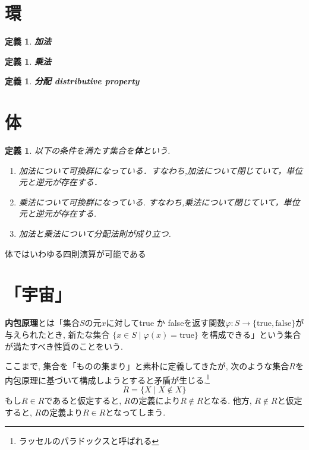 \documentclass[dvipdfmx]{jsbook}
\theoremstyle{plain}
\newtheorem{Def}[thm]{定義}
\begin{document}
\section{環}
\begin{Def}
{\bf 加法}
\end{Def}
\begin{Def}
{\bf 乗法}
\end{Def}
\begin{Def}
{\bf 分配 distributive property}
\end{Def}


\section{体}
\begin{Def}
以下の条件を満たす集合を{\bf 体}という.
\begin{enumerate}
\item
加法について可換群になっている．すなわち,加法について閉じていて，単位元と逆元が存在する．
\item 
乗法について可換群になっている. すなわち,乗法について閉じていて，単位元と逆元が存在する.
\item 
加法と乗法について分配法則が成り立つ.
\end{enumerate}
\end{Def}
体ではいわゆる四則演算が可能である

\section{「宇宙」}
{\bf 内包原理}とは「集合$S$の元$x$に対してtrue か falseを返す関数$\varphi:S\rightarrow\{\mathrm{true},\mathrm{false}\}$が与えられたとき, 新たな集合
$
\{x\in S\mid\varphi(x)=\mathrm{true}\}
$
を構成できる」という集合が満たすべき性質のことをいう. 

ここまで, 集合を「ものの集まり」と素朴に定義してきたが, 次のような集合$R$を内包原理に基づいて構成しようとすると矛盾が生じる.\footnote{ラッセルのパラドックスと呼ばれる}
\[
R=\{X\mid X\notin X\}
\]
もし$R\in R$であると仮定すると, $R$の定義により$R\notin R$となる.
他方, $R\notin R$と仮定すると, $R$の定義より$R\in R$となってしまう.
\end{document}
